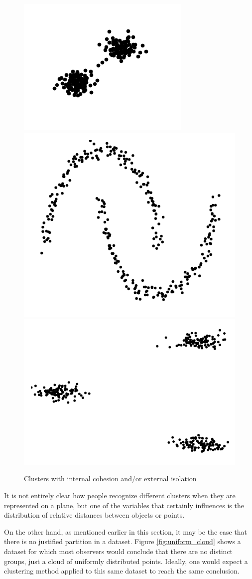 \begin{figure}[bth]
	\myfloatalign
	{\includegraphics[width=.3\linewidth]{gfx/Clustering/TwoBasicsClusters}}
	{\includegraphics[width=.3\linewidth]{gfx/Clustering/MoonsBasics}}
	{\includegraphics[width=.3\linewidth]{gfx/Clustering/ThreeBasicClusters}}
	\caption[Clusters with internal cohesion and/or external isolation]{Clusters with internal cohesion and/or external isolation}\label{fig:clusters_properties}
\end{figure}

It is not entirely clear how people recognize different clusters when they are represented on a plane, but one of the variables that certainly influences is the distribution of relative distances between objects or points.

On the other hand, as mentioned earlier in this section, it may be the case that there is no justified partition in a dataset. Figure \ref{fig:uniform_cloud} shows a dataset for which most observers would conclude that there are no distinct groups, just a cloud of uniformly distributed points. Ideally, one would expect a clustering method applied to this same dataset to reach the same conclusion.

